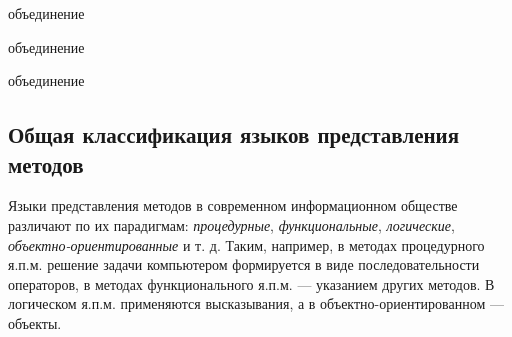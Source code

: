 \begin{SCn}
\begin{scnreltoset}{объединение}
    \scnitem{\scnnonamednode}
    \begin{scnindent}
        \begin{scnreltoset}{объединение}
        \end{scnreltoset}
    \end{scnindent}
    \scnitem{\scnnonamednode}
    \begin{scnindent}
        \begin{scnreltoset}{объединение}
        \end{scnreltoset}
    \end{scnindent}
\end{scnreltoset}
\end{SCn}

\subsection{Общая классификация языков представления методов}
\label{sec_programs_method_representation_language_classification}

Языки представления методов в современном информационном обществе различают по их парадигмам: \textit{процедурные}, \textit{функциональные}, \textit{логические}, \textit{объектно-ориентированные} и т. д. Таким, например, в методах процедурного я.п.м. решение задачи компьютером формируется в виде последовательности операторов, в методах функционального я.п.м. — указанием других методов. В логическом я.п.м. применяются высказывания, а в объектно-ориентированном — объекты.

\begin{SCn}
\begin{scnindent}
\end{scnindent}
\begin{scnindent}
\end{scnindent}
\begin{scnindent}
    \begin{scneqtoset}
    \end{scneqtoset}
\end{scnindent}
\end{SCn}

